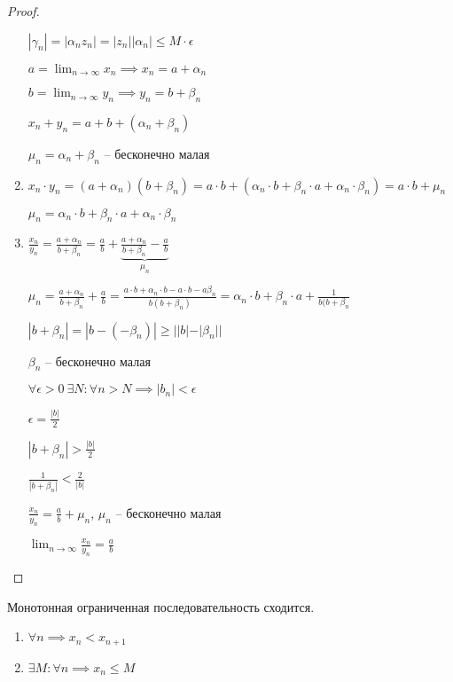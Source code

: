 \begin{proof}
\begin{enumerate}
        $|\gamma_n| = |\alpha_n z_n| = |z_n||\alpha_n| \leq M \cdot \epsilon$

        $a = \lim_{n \to \infty} x_n \implies x_n = a + \alpha_n$

        $b = \lim_{n \to \infty} y_n \implies y_n = b + \beta_n$

        $x_n + y_n = a + b + (\alpha_n + \beta_n)$

        $\mu_n = \alpha_n + \beta_n$ -- бесконечно малая
    \item
        $x_n \cdot y_n = (a + \alpha_n)(b + \beta_n) = a \cdot b + (\alpha_n \cdot b + \beta_n \cdot a + \alpha_n \cdot \beta_n) = a \cdot b + \mu_n$

        $\mu_n = \alpha_n \cdot b + \beta_n \cdot a + \alpha_n \cdot \beta_n$

    \item
        $\frac{x_n}{y_n} = \frac{a + \alpha_n}{b + \beta_n} = \frac{a}{b} + \underbrace{\frac{a + \alpha_n}{b + \beta_n} - \frac{a}{b}}_{\mu_n}$

        $\mu_n = \frac{a + \alpha_n}{b + \beta_n} + \frac{a}{b} = \frac{a \cdot b + \alpha_n \cdot b - a \cdot b - a \beta_n}{b(b + \beta_n)} = \alpha_n \cdot b + \beta_n \cdot a + \frac{1}{b(b + \beta_n}$

        $|b + \beta_n| = |b - (-\beta_n)| \geq ||b| - |\beta_n||$

        $\beta_n$ -- бесконечно малая

        $\forall \epsilon > 0 \ \exists N : \forall n > N \implies |b_n| < \epsilon$

        $\epsilon = \frac{|b|}{2}$

        $|b + \beta_n| > \frac{|b|}{2}$

        $\frac{1}{|b + \beta_n|} < \frac{2}{|b|}$

        $\frac{x_n}{y_n} = \frac{a}{b} + \mu_n$, $\mu_n$ -- бесконечно малая

        $\lim_{n \to \infty} \frac{x_n}{y_n} = \frac{a}{b}$
    \end{enumerate}
\end{proof}


\begin{theorem}
    Монотонная ограниченная последовательность сходится.
\end{theorem}

\begin{enumerate}
\item $\forall n \implies x_n < x_{n + 1}$
\item $\exists M : \forall n \implies x_n \leq M$
\end{enumerate}

